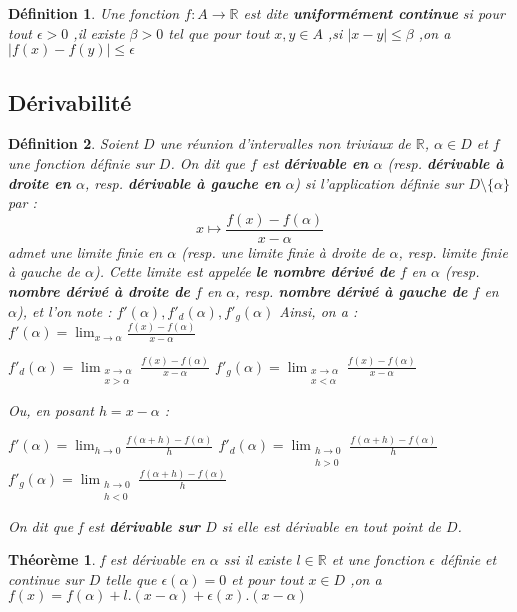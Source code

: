 \documentclass[a4paper,12pt]{article} %
\newtheorem{theoreme}{Théorème}[section]
\newtheorem{definition}{Définition}[section]
\begin{document}
	 \begin{definition}
	    Une fonction $f:A \rightarrow \mathbb{R}$ est dite \textbf{uniformément continue} si 
	    pour tout $\epsilon>0$ ,il existe $\beta >0$ tel que pour tout $x,y \in A$ ,si $|x-y| \leq \beta$ ,on a $|f(x)-f(y)| \leq \epsilon$ 
	     
	 \end{definition}
     \subsection{Dérivabilité}
	

	   	\begin{definition}
	   	
	   	Soient $D$ une réunion d’intervalles non triviaux de $\mathbb{R}$, $\alpha \in D$ et $f$ une fonction définie sur $D$.  
	   	On dit que $f$ est \textbf{dérivable en} $\alpha$ (resp. \textbf{dérivable à droite en} $\alpha$, resp. \textbf{dérivable à gauche en} $\alpha$) si l’application définie sur $D \setminus \{\alpha\}$ par :
	   	\[
	   	x \mapsto \frac{f(x) - f(\alpha)}{x - \alpha}
	   	\]
	   	admet une limite finie en $\alpha$ (resp. une limite finie à droite de $\alpha$, resp. limite finie à gauche de $\alpha$).  
	   	Cette limite est appelée \textbf{le nombre dérivé de} $f$ en $\alpha$ (resp. \textbf{nombre dérivé à droite de} $f$ en $\alpha$, resp. \textbf{nombre dérivé à gauche de} $f$ en $\alpha$), et l’on note :
	   	$f'(\alpha),  f'_d(\alpha),  f'_g(\alpha)$
	   	Ainsi, on a :
	   	$f'(\alpha) = \lim_{x \to \alpha} \frac{f(x) - f(\alpha)}{x - \alpha}$
	   	
	   	$f'_d(\alpha) = \lim_{\substack{x \to \alpha \\ x > \alpha}} \frac{f(x) - f(\alpha)}{x - \alpha}$
	   	$f'_g(\alpha) = \lim_{\substack{x \to \alpha \\ x < \alpha}} \frac{f(x) - f(\alpha)}{x - \alpha}$
	   	
	   	Ou, en posant $h = x - \alpha$ :
	   	
	   	$
	   	f'(\alpha) = \lim_{h \to 0} \frac{f(\alpha + h) - f(\alpha)}{h}$
	   $	f'_d(\alpha) = \lim_{\substack{h \to 0 \\ h > 0}} \frac{f(\alpha + h) - f(\alpha)}{h}$
	   	$f'_g(\alpha) = \lim_{\substack{h \to 0 \\ h < 0}} \frac{f(\alpha + h) - f(\alpha)}{h}$
	   	
	   	On dit que f est \textbf{dérivable sur} $D$ si elle est dérivable en tout point de $D$.
	   	\end{definition}
	   	\begin{theoreme}
	   f est dérivable en $\alpha$  ssi il existe $l \in \mathbb{R}$ et une fonction $\epsilon$ définie et continue sur $D$ telle que $\epsilon(\alpha)=0$  et pour tout $x \in D$ ,on a $f(x)=f(\alpha)+l.(x-\alpha) + \epsilon(x).(x-\alpha)$ 
	   \end{theoreme}
	   
\end{document}
